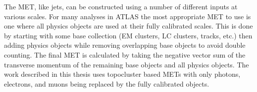 The MET, like jets, can be constructed using a number of different inputs at various scales.  
For many analyses in ATLAS the most appropriate MET to use is one where all physics objects are used at their fully calibrated scales.  
This is done by starting with some base collection (EM clusters, LC clusters, tracks, etc.) then adding physics objects while removing overlapping base objects to avoid double counting.  
The final MET is calculated by taking the negative vector sum of the transverse momentum of the remaining base objects and all physics objects.  
The work described in this thesis uses topocluster based METs with only photons, electrons, and muons being replaced by the fully calibrated objects.  




